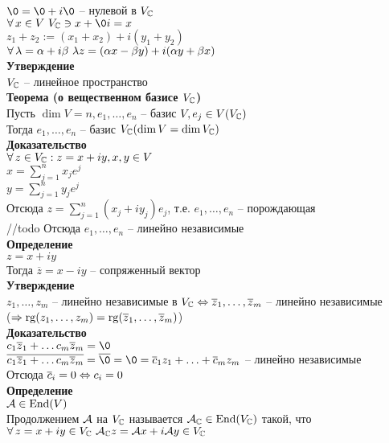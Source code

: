 \documentclass[12pt]{article}
\begin{document}
$\0 = \0 + i\0$ -- нулевой в $V_\mathbb{C}$\\
$\fall x \in V\ V_\Cset \ni x+\0i = x$\\
$z_1 + z_2 := (x_1+x_2)+i(y_1+y_2)$\\
$\forall\, \lambda = \alpha + i\beta\ \lambda z = (\alpha x - \beta y) + i (\alpha y + \beta x)$\\
\textbf{Утверждение}\\
$V_\mathbb{C}$ -- линейное пространство\\
\textbf{Теорема (о вещественном базисе $V_\mathbb{C}$)}\\
Пусть $\dim V = n, e_1, \ldots, e_n$ -- базис $V, e_j \in V(V_\mathbb{C})$\\
Тогда $e_1, \ldots, e_n$ -- базис $V_\mathbb{C} (\dim V = \dim V_\mathbb{C})$\\
\textbf{Доказательство}\\
$\forall\, z \in V_\mathbb{C}: z = x+iy, x,y \in V$\\
$x = \sum_{j=1}^n x_je^j$\\
$y = \sum_{j=1}^n y_je^j$\\
Отсюда $z = \sum_{j=1}^n(x_j + iy_j) e_j$, т.е. $e_1, \ldots, e_n$ -- порождающая\\
//todo
Отсюда $e_1, \ldots, e_n$ -- линейно независимые\\
\textbf{Определение}\\
$z=x+iy$\\
Тогда $\overline z = x-iy$ -- сопряженный вектор\\
\textbf{Утверждение}\\
$z_1, \ldots, z_m$ -- линейно независимые в $V_\mathbb{C} \Leftrightarrow \overline z_1, \ldots, \overline z_m$ -- линейно независимые\\
($\Rightarrow \operatorname{rg} (z_1, \ldots, z_m) = \operatorname{rg} (\overline z_1, \ldots, \overline z_m)$)\\
\textbf{Доказательство}\\
$c_1 \ol z_1 + \ldots c_m \ol z_m = \0$\\
$\ol{c_1 \ol z_1 + \ldots c_m \ol z_m} = \ol \0 = \0 = \ol c_1 z_1 + \ldots + \ol c_m z_m$ -- линейно независимые\\
Отсюда $\overline c_i = 0 \Leftrightarrow c_i = 0$\\
\textbf{Определение}\\
$\mathcal{A} \in \operatorname{End}(V)$\\
Продолжением $\mathcal{A}$ на $V_\mathbb{C}$ называется $\mathcal{A}_\mathbb{C} \in \operatorname{End}(V_\mathbb{C})$ такой, что\\
$\forall\, z=x+iy\in V_\mathbb{C}\ \mathcal{A}_\mathbb{C} z = \mathcal{A} x + i\mathcal{A} y \in V_\mathbb{C}$\\
\end{document}
